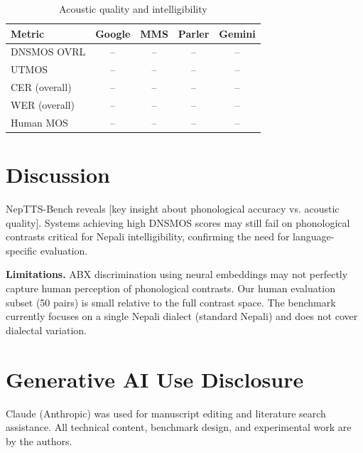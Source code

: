 \documentclass{Interspeech}
\begin{document}
\begin{table}[t]
  \caption{Acoustic quality and intelligibility}
  \label{tab:results_quality}
  \centering
  \small
  \begin{tabular}{lcccc}
    \toprule
    \textbf{Metric} & \textbf{Google} & \textbf{MMS} & \textbf{Parler} & \textbf{Gemini} \\
    \midrule
    DNSMOS OVRL & -- & -- & -- & -- \\
    UTMOS & -- & -- & -- & -- \\
    CER (overall) & -- & -- & -- & -- \\
    WER (overall) & -- & -- & -- & -- \\
    Human MOS & -- & -- & -- & -- \\
    \bottomrule
  \end{tabular}
\end{table}

\section{Discussion}


NepTTS-Bench reveals [key insight about phonological accuracy vs. acoustic quality]. Systems achieving high DNSMOS scores may still fail on phonological contrasts critical for Nepali intelligibility, confirming the need for language-specific evaluation.

\textbf{Limitations.} ABX discrimination using neural embeddings may not perfectly capture human perception of phonological contrasts. Our human evaluation subset (50 pairs) is small relative to the full contrast space. The benchmark currently focuses on a single Nepali dialect (standard Nepali) and does not cover dialectal variation.



\section{Generative AI Use Disclosure}
Claude (Anthropic) was used for manuscript editing and literature search assistance. All technical content, benchmark design, and experimental work are by the authors.



\end{document}
